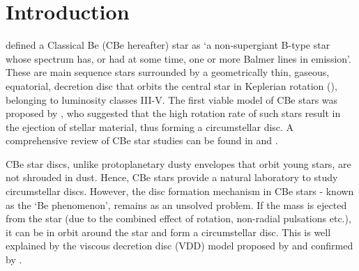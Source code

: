 \documentclass{jaa}
\begin{document}

\artcitid{\#\#\#\#}
\setcounter{page}{1}

\section{Introduction}
\cite{1987Collins} defined a Classical Be (CBe hereafter) star as ‘a non-supergiant B-type star whose spectrum has, or had at some time, one or more Balmer lines in emission'. These are main sequence stars surrounded by a geometrically thin, gaseous, equatorial, decretion disc that orbits the central star in Keplerian rotation (\citealt{2007Meilland}), belonging to luminosity classes III-V. The first viable model of CBe stars was proposed by \cite{1931Struve}, who suggested that the high rotation rate of such stars result in the ejection of stellar material, thus forming a circumstellar disc. A comprehensive review of CBe star studies can be found in \cite{2013Rivinius} and \cite{2003Porter}.

CBe star discs, unlike protoplanetary dusty envelopes that orbit young stars, are not shrouded in dust. Hence, CBe stars provide a natural laboratory to study circumstellar discs. However, the disc formation mechanism in CBe stars - known as the ‘Be phenomenon’, remains as an unsolved problem. If the mass is ejected from the star (due to the combined effect of rotation, non-radial pulsations etc.), it can be in orbit around the star and form a circumstellar disc. This is well explained by the viscous decretion disc (VDD) model proposed by \cite{1991Lee} and confirmed by \cite{2012Carciofi}.
\end{document}
